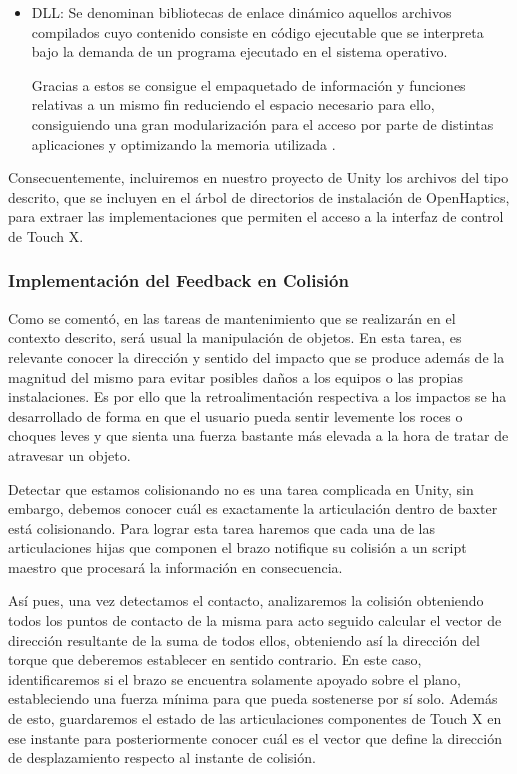 \begin{itemize}
    \item DLL: Se denominan bibliotecas de enlace dinámico aquellos archivos compilados cuyo contenido consiste en código ejecutable que se interpreta bajo la demanda de un programa ejecutado en el sistema operativo. 

    Gracias a estos se consigue el empaquetado de información y funciones relativas a un mismo fin reduciendo el espacio necesario para ello, consiguiendo una gran modularización para el acceso por parte de distintas aplicaciones y optimizando la memoria utilizada \cite{75}.
\end{itemize}

Consecuentemente, incluiremos en nuestro proyecto de Unity los archivos del tipo descrito, que se incluyen en el árbol de directorios de instalación de OpenHaptics, para extraer las implementaciones que permiten el acceso a la interfaz de control de Touch X.

\subsubsection{Implementación del Feedback en Colisión}
Como se comentó, en las tareas de mantenimiento que se realizarán en el contexto descrito, será usual la manipulación de objetos. En esta tarea, es relevante conocer la dirección y sentido del impacto que se produce además de la magnitud del mismo para evitar posibles daños a los equipos o las propias instalaciones. Es por ello que la retroalimentación respectiva a los impactos se ha desarrollado de forma en que el usuario pueda sentir levemente los roces o choques leves y que sienta una fuerza bastante más elevada a la hora de tratar de atravesar un objeto.

Detectar que estamos colisionando no es una tarea complicada en Unity, sin embargo, debemos conocer cuál es exactamente la articulación dentro de baxter está colisionando. Para lograr esta tarea haremos que cada una de las articulaciones hijas que componen el brazo notifique su colisión a un script maestro que procesará la información en consecuencia.

Así pues, una vez detectamos el contacto, analizaremos la colisión obteniendo todos los puntos de contacto de la misma para acto seguido calcular el vector de dirección resultante de la suma de todos ellos, obteniendo así la dirección del torque que deberemos establecer en sentido contrario. En este caso, identificaremos si el brazo se encuentra solamente apoyado sobre el plano, estableciendo una fuerza mínima para que pueda sostenerse por sí solo. Además de esto, guardaremos el estado de las articulaciones componentes de Touch X en ese instante para posteriormente conocer cuál es el vector que define la dirección de desplazamiento respecto al instante de colisión.

